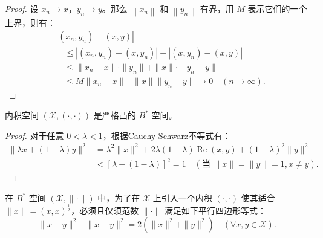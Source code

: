 \documentclass[lang=cn,newtx,10pt,scheme=chinese,thmcnt=chapter]{elegantbook}
\begin{document}
\begin{proof}
设 $x_n \rightarrow x$，$y_n \rightarrow y$。那么 $\left\|x_n\right\|$ 和 $\left\|y_n\right\|$ 有界，用 $M$ 表示它们的一个上界，则有：
\begin{equation*}
\begin{aligned}
& \left|\left(x_n, y_n\right) - (x, y)\right| \\
&\quad \leqslant \left|\left(x_n, y_n\right) - \left(x, y_n\right)\right| + \left|\left(x, y_n\right) - (x, y)\right| \\
&\quad \leqslant \|x_n - x\| \cdot \|y_n\| + \|x\| \cdot \|y_n - y\| \\
&\quad \leqslant M\|x_n - x\| + \|x\| \|y_n - y\| \rightarrow 0 \quad (n \rightarrow \infty).
\end{aligned}
\end{equation*}
\end{proof}

\begin{proposition}
内积空间 $(\mathscr{X}, (\cdot, \cdot))$ 是严格凸的 $B^*$ 空间。
\end{proposition}

\begin{proof}
对于任意 $0 < \lambda < 1$，根据Cauchy-Schwarz不等式有：
\begin{equation*}
\begin{aligned}
\|\lambda x + (1-\lambda) y\|^2 &= \lambda^2 \|x\|^2 + 2 \lambda (1-\lambda) \operatorname{Re}(x, y) + (1-\lambda)^2 \|y\|^2 \\
&< [\lambda + (1-\lambda)]^2 = 1 \quad (\text{当 } \|x\| = \|y\| = 1, x \neq y).
\end{aligned}
\end{equation*}

\end{proof}

\begin{proposition}
在 $B^*$ 空间 $(\mathscr{X}, \|\cdot\|)$ 中，为了在 $\mathscr{X}$ 上引入一个内积 $(\cdot, \cdot)$ 使其适合 $\|x\|=(x,x)^{\frac{1}{2}}$，必须且仅须范数 $\|\cdot\|$ 满足如下平行四边形等式：
\begin{equation*}
\|x + y\|^2 + \|x - y\|^2 = 2\left(\|x\|^2 + \|y\|^2\right) \quad (\forall x, y \in \mathscr{X}).
\end{equation*}
\end{proposition}
\end{document}
